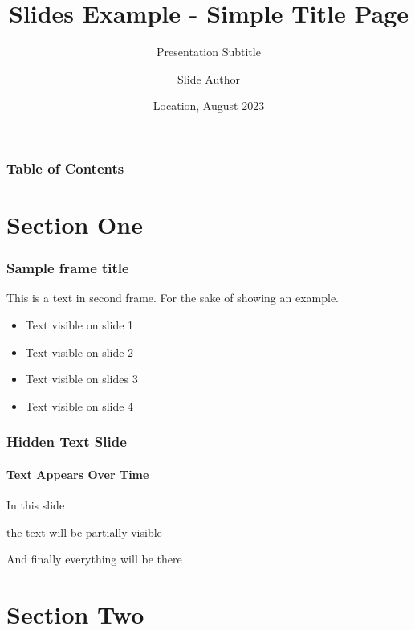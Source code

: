 \documentclass{beamer}
\title[Slides Example - Simple Title Page] %
{Slides Example - Simple Title Page}
\subtitle{Presentation Subtitle}
\author[Author, Slide] %
{Slide Author\inst{1}}
\institute[Institutional Affiliation] %
{
  \inst{1}%
  Institutional Affiliation
}
\date[2023.08] %
{Location, August 2023}
\begin{document}
\frame[nittany]{\titlepage}

\begin{frame}
\frametitle{Table of Contents}
\tableofcontents
\end{frame}


\section{Section One}

\begin{frame}
\frametitle{Sample frame title}


This is a text in second frame. For the sake of showing an example.

\begin{itemize}
    \item<1-> Text visible on slide 1
    \item<2-> Text visible on slide 2
    \item<3> Text visible on slides 3
    \item<4-> Text visible on slide 4
\end{itemize}
\end{frame}



\begin{frame}
\frametitle{Hidden Text Slide}
\framesubtitle{Text Appears Over Time}
In this slide \pause

the text will be partially visible \pause

And finally everything will be there
\end{frame}

\section{Section Two}
\end{document}
